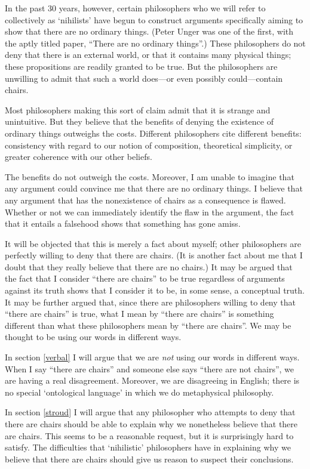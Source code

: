 \documentclass[11pt]{article}
\begin{document}
\begin{spacing}{1.5}
In the past 30 years, however, certain philosophers who we will refer
to collectively as `nihilists' have begun to construct arguments
specifically aiming to show that there are no ordinary things.  (Peter
Unger was one of the first, with the aptly titled paper, ``There are
no ordinary things''.)  These philosophers do not deny that there is
an external world, or that it contains many physical things; these
propositions are readily granted to be true.  But the philosophers are
unwilling to admit that such a world does---or even possibly
could---contain chairs.

Most philosophers making this sort of claim admit that it is strange
and unintuitive.  But they believe that the benefits of denying the
existence of ordinary things outweighs the costs.  Different
philosophers cite different benefits: consistency with regard to our
notion of composition, theoretical simplicity, or greater coherence
with our other beliefs.

The benefits do not outweigh the costs.  Moreover, I am unable to
imagine that any argument could convince me that there are no ordinary
things.  I believe that any argument that has the nonexistence of
chairs as a consequence is flawed.  Whether or not we can immediately
identify the flaw in the argument, the fact that it entails a
falsehood shows that something has gone amiss.

It will be objected that this is merely a fact about myself; other
philosophers are perfectly willing to deny that there are chairs.  (It
is another fact about me that I doubt that they really believe that
there are no chairs.)  It may be argued that the fact that I consider
``there are chairs'' to be true regardless of arguments against its
truth shows that I consider it to be, in some sense, a conceptual
truth.  It may be further argued that, since there are philosophers
willing to deny that ``there are chairs'' is true, what I mean by
``there are chairs'' is something different than what these
philosophers mean by ``there are chairs''.  We may be thought to be
using our words in different ways.

In section \ref{verbal} I will argue that we are {\em not} using our
words in different ways.  When I say ``there are chairs'' and someone
else says ``there are not chairs'', we are having a real disagreement.
Moreover, we are disagreeing in English; there is no special
`ontological language' in which we do metaphysical philosophy.

In section \ref{stroud} I will argue that any philosopher who attempts
to deny that there are chairs should be able to explain why we
nonetheless believe that there are chairs.  This seems to be a
reasonable request, but it is surprisingly hard to satisfy.  The
difficulties that `nihilistic' philosophers have in explaining why we
believe that there are chairs should give us reason to suspect their
conclusions.


\end{spacing}
\end{document}
